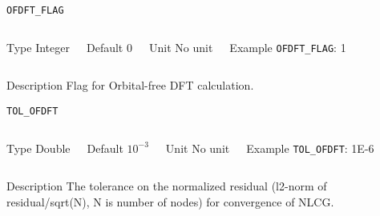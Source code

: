 \begin{frame}[allowframebreaks]{\texttt{OFDFT\_FLAG}} \label{OFDFT_FLAG}
\vspace*{-12pt}
\begin{columns}
\begin{block}{Type}
Integer
\end{block}

\begin{block}{Default}
0
\end{block}

\begin{block}{Unit}
No unit
\end{block}

\begin{block}{Example}
\texttt{OFDFT\_FLAG}: 1
\end{block}
\end{columns}

\begin{block}{Description}
Flag for Orbital-free DFT calculation.
\end{block}

\end{frame}



\begin{frame}[allowframebreaks]{\texttt{TOL\_OFDFT}} \label{TOL_OFDFT}
\vspace*{-12pt}
\begin{columns}
\begin{block}{Type}
Double
\end{block}

\begin{block}{Default}
$10^{-3}$
\end{block}

\begin{block}{Unit}
No unit
\end{block}

\begin{block}{Example}
\texttt{TOL\_OFDFT}: 1E-6
\end{block}
\end{columns}

\begin{block}{Description}
The tolerance on the normalized residual (l2-norm of residual/sqrt(N), N is number of nodes) for convergence of NLCG. 
\end{block}

\end{frame}


